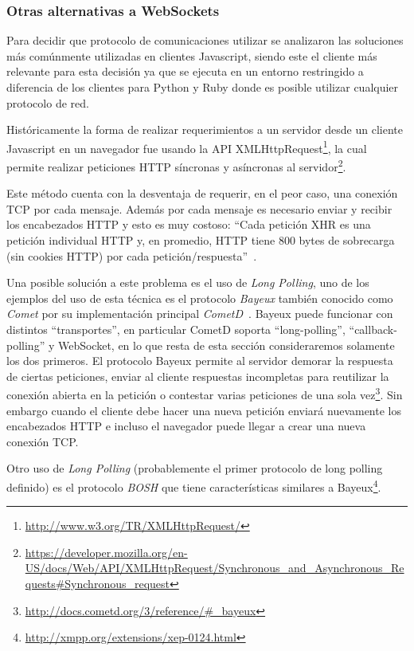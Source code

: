 \subsubsection{Otras alternativas a WebSockets}
Para decidir que protocolo de comunicaciones utilizar se analizaron
las soluciones más comúnmente utilizadas en clientes Javascript, siendo
este el cliente más relevante para esta decisión ya que se ejecuta en
un entorno restringido a diferencia de los clientes para Python y Ruby donde
es posible utilizar cualquier protocolo de red.

Históricamente la forma de realizar requerimientos a un servidor desde un
cliente Javascript en un navegador fue usando la API
XMLHttpRequest\footnote{\url{http://www.w3.org/TR/XMLHttpRequest/}}, la
cual permite realizar peticiones HTTP síncronas y asíncronas al
servidor\footnote{\url{https://developer.mozilla.org/en-US/docs/Web/API/XMLHttpRequest/Synchronous_and_Asynchronous_Requests\#Synchronous_request}}.

Este método cuenta con la desventaja de requerir, en el peor caso, una conexión
TCP por cada mensaje. Además por cada mensaje es necesario
enviar y recibir los encabezados HTTP y esto es muy costoso:
``Cada petición XHR es una petición individual HTTP y, en promedio, HTTP
tiene 800 bytes de sobrecarga (sin cookies HTTP) por cada
petición/respuesta''~\citep{grigorik_2013}.

Una posible solución a este problema es el uso de \textit{Long Polling},
uno de los ejemplos del uso de esta técnica es el protocolo \textit{Bayeux}
también conocido como \textit{Comet} por
su implementación principal
\textit{CometD}~\citep{roden_2010}. Bayeux puede funcionar con distintos
``transportes'', en particular CometD soporta ``long-polling'',
``callback-polling'' y WebSocket, en lo que resta de esta sección
consideraremos solamente los dos primeros.
El protocolo Bayeux permite al servidor demorar la respuesta
de ciertas peticiones, enviar al cliente respuestas incompletas para reutilizar
la conexión abierta en la petición o contestar varias peticiones de
una sola vez\footnote{\url{http://docs.cometd.org/3/reference/\#_bayeux}}.
Sin embargo cuando el cliente debe hacer una nueva petición enviará
nuevamente los encabezados HTTP e incluso el navegador puede llegar a
crear una nueva conexión TCP.

Otro uso de \textit{Long Polling} (probablemente el primer protocolo
de long polling definido) es el protocolo \textit{BOSH} que tiene
características similares a
Bayeux\footnote{\url{http://xmpp.org/extensions/xep-0124.html}}.

